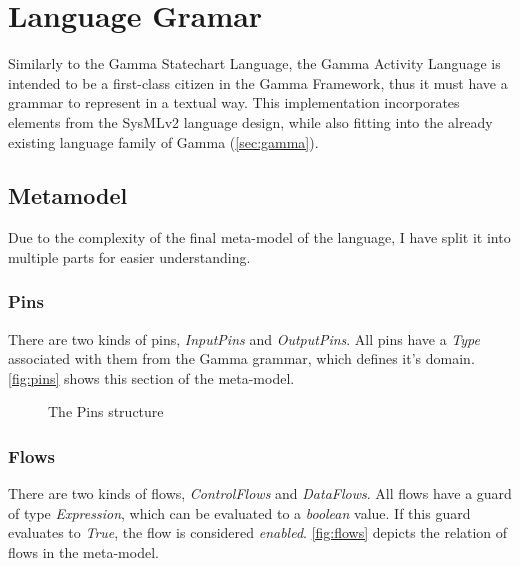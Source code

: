 \clearpage\section{Language Gramar}

Similarly to the Gamma Statechart Language, the Gamma Activity Language is intended to be a first-class citizen in the Gamma Framework, thus it must have a grammar to represent in a textual way. This implementation incorporates elements from the SysMLv2 \cite{omg_sysml_v2} language design, while also fitting into the already existing language family of Gamma (\autoref{sec:gamma}).

\subsection{Metamodel}

Due to the complexity of the final meta-model of the language, I have split it into multiple parts for easier understanding.\

\subsubsection{Pins}\label{ssec:pins}

There are two kinds of pins, \emph{InputPins} and \emph{OutputPins}. All pins have a \emph{Type} associated with them from the Gamma grammar, which defines it's domain. \autoref{fig:pins} shows this section of the meta-model.

\begin{figure}[!ht]
	\centering
	
	\caption{The Pins structure}
	\label{fig:pins}
\end{figure}

\subsubsection{Flows}\label{ssec:flows}

There are two kinds of flows, \emph{ControlFlows} and \emph{DataFlows}. All flows have a guard of type \emph{Expression}, which can be evaluated to a \emph{boolean} value. If this guard evaluates to \emph{True}, the flow is considered \emph{enabled}. \autoref{fig:flows} depicts the relation of flows in the meta-model.

